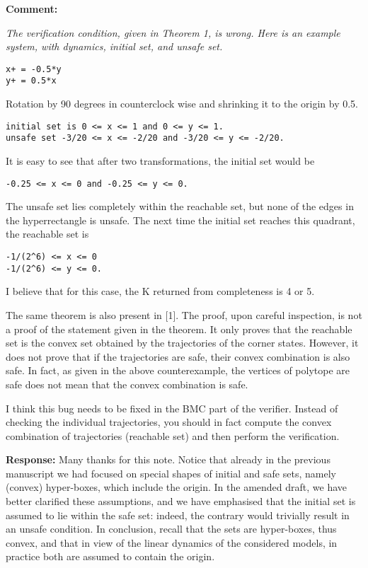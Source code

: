 \documentclass{article}
\begin{document}
{\bf Comment: }{\itshape
The verification condition, given in Theorem 1, is wrong. Here is an example system, with dynamics, initial set, and unsafe set.

\begin{verbatim}
x+ = -0.5*y
y+ = 0.5*x
\end{verbatim}


Rotation by 90 degrees in counterclock wise and shrinking it to the origin by 0.5.
\begin{verbatim}
initial set is 0 <= x <= 1 and 0 <= y <= 1.
unsafe set -3/20 <= x <= -2/20 and -3/20 <= y <= -2/20.
\end{verbatim}

It is easy to see that after two transformations, the initial set would be
\begin{verbatim}
-0.25 <= x <= 0 and -0.25 <= y <= 0.
\end{verbatim}
The unsafe set lies completely within the reachable set, but none of the edges in the hyperrectangle is unsafe. The next time the initial set reaches
this quadrant, the reachable set is
\begin{verbatim}
-1/(2^6) <= x <= 0
-1/(2^6) <= y <= 0.
\end{verbatim}

I believe that for this case, the K returned from completeness is 4 or 5.

The same theorem is also present in [1]. The proof, upon careful inspection, is not a proof of the statement given in the theorem. It only proves
that the reachable set is the convex set obtained by the trajectories of the corner states. However, it does not prove that if the trajectories are
safe, their convex combination is also safe. In fact, as given in the above counterexample, the vertices of polytope are safe does not mean that the
convex combination is safe.

I think this bug needs to be fixed in the BMC part of the verifier. Instead of checking the individual trajectories, you should in fact compute the
convex combination of trajectories (reachable set) and then perform the verification.}

\vspace{1em}
{\bf Response: }
Many thanks for this note. 
Notice that already in the previous manuscript we had focused on special shapes of initial and safe sets, namely (convex) hyper-boxes, which include the
origin. 
In the amended draft, we have better clarified these assumptions, and 
we have emphasised that the initial set is assumed to lie within the safe set: indeed, the contrary would trivially result in an unsafe condition. 
In conclusion, recall that the sets are hyper-boxes, thus convex, and that in view of the linear dynamics of the considered models, in practice both 
are assumed to contain the origin.   
\end{document}
